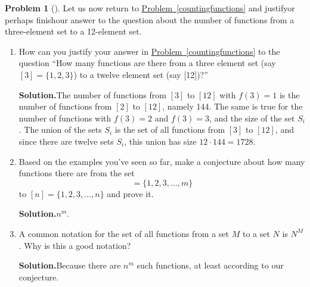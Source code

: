 \documentclass[10pt,]{book}
\theoremstyle{plain}
\theoremstyle{definition}
\newtheorem{activity}[project]{Problem}
\theoremstyle{definition}
\numberwithin{equation}{chapter}
\begin{document}
\begin{activity}[]\label{countingfunctions2}
Let us now return to \hyperref[countingfunctions]{Problem~\ref{countingfunctions}} and justify\textemdash{}or perhaps finish\textemdash{}our answer to the question about the number of functions from a three-element set to a 12-element set.%
\begin{enumerate}[font=\bfseries,label=(\alph*),ref=\alph*]
\item\label{task-15} How can you justify your answer in \hyperref[countingfunctions]{Problem~\ref{countingfunctions}} to the question ``How many functions are there from a three element set (say \([3]=\{1,2,3\}\)) to a twelve element set (say [12])?''%
\par\medskip\noindent%
\textbf{Solution.}\quad The number of functions from \([3]\) to \([12]\) with \(f(3) =1\) is the number of functions from \([2]\) to \([12]\), namely 144. The same is true for the number of functions with \(f(3)=2\) and \(f(3)=3\), and the size of the set \(S_i\). The union of the sets \(S_i\) is the set of all functions from \([3]\) to \([12]\), and since there are twelve sets \(S_i\), this union has size \(12\cdot144= 1728\).%
\item\label{numberoffunctionsconjecture} Based on the examples you've seen so far, make a conjecture about how many functions there are from the set%
\begin{equation*}
[m] = \{1,2,3,\dots,m\}
\end{equation*}
to \([n]=\{1,2,3,\dots,n\}\) and prove it.%
\par\medskip\noindent%
\textbf{Solution.}\quad \(n^m\).%
\item\label{task-17} A common notation for the set of all functions from a set \(M\) to a set \(N\) is \(N^M\).  Why is this a good notation?%
\par\medskip\noindent%
\textbf{Solution.}\quad Because there are \(n^m\) such functions, at least according to our conjecture.%
\end{enumerate}
\end{activity}
\end{document}
